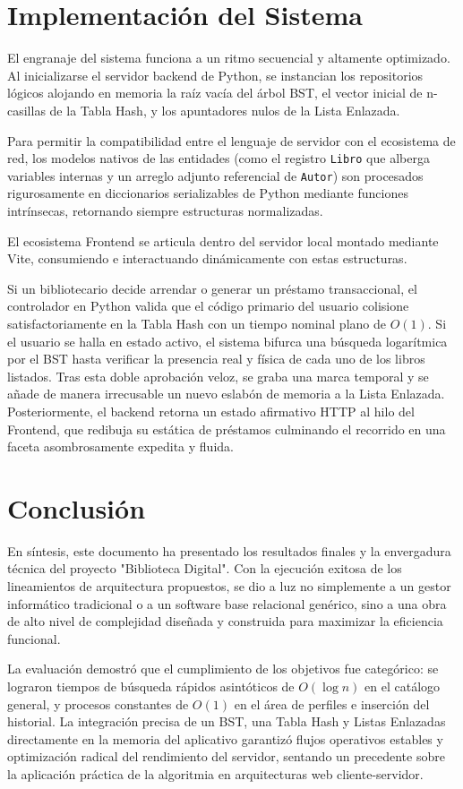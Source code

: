 \documentclass{rapport}
\begin{document}
\section{Implementación del Sistema}

El engranaje del sistema funciona a un ritmo secuencial y altamente optimizado. Al inicializarse el servidor backend de Python, se instancian los repositorios lógicos alojando en memoria la raíz vacía del árbol BST, el vector inicial de n-casillas de la Tabla Hash, y los apuntadores nulos de la Lista Enlazada.

Para permitir la compatibilidad entre el lenguaje de servidor con el ecosistema de red, los modelos nativos de las entidades (como el registro \texttt{Libro} que alberga variables internas y un arreglo adjunto referencial de \texttt{Autor}) son procesados rigurosamente en diccionarios serializables de Python mediante funciones intrínsecas, retornando siempre estructuras normalizadas.

El ecosistema Frontend se articula dentro del servidor local montado mediante Vite, consumiendo e interactuando dinámicamente con estas estructuras.

Si un bibliotecario decide arrendar o generar un préstamo transaccional, el controlador en Python valida que el código primario del usuario colisione satisfactoriamente en la Tabla Hash con un tiempo nominal plano de $O(1)$. Si el usuario se halla en estado activo, el sistema bifurca una búsqueda logarítmica por el BST hasta verificar la presencia real y física de cada uno de los libros listados. Tras esta doble aprobación veloz, se graba una marca temporal y se añade de manera irrecusable un nuevo eslabón de memoria a la Lista Enlazada. Posteriormente, el backend retorna un estado afirmativo HTTP al hilo del Frontend, que redibuja su estática de préstamos culminando el recorrido en una faceta asombrosamente expedita y fluida.

\section{Conclusión}

En síntesis, este documento ha presentado los resultados finales y la envergadura técnica del proyecto "Biblioteca Digital". Con la ejecución exitosa de los lineamientos de arquitectura propuestos, se dio a luz no simplemente a un gestor informático tradicional o a un software base relacional genérico, sino a una obra de alto nivel de complejidad diseñada y construida para maximizar la eficiencia funcional.

La evaluación demostró que el cumplimiento de los objetivos fue categórico: se lograron tiempos de búsqueda rápidos asintóticos de $O(\log n)$ en el catálogo general, y procesos constantes de $O(1)$ en el área de perfiles e inserción del historial. La integración precisa de un BST, una Tabla Hash y Listas Enlazadas directamente en la memoria del aplicativo garantizó flujos operativos estables y optimización radical del rendimiento del servidor, sentando un precedente sobre la aplicación práctica de la algoritmia en arquitecturas web cliente-servidor.
\end{document}
